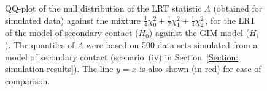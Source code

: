 \documentclass[11pt]{article}
\begin{document}
\vspace*{0.5cm}

\begin{figure}[t]
\vspace*{-0.5cm}
\caption{QQ-plot of the null distribution of the LRT statistic $\Lambda$ (obtained for simulated data) against the mixture $\frac{1}{4} \chi^2_0 +\frac{1}{2} \chi^2_1 +\frac{1}{4} \chi^2_2$\,, for the LRT of the model of secondary contact ($H_0$) against the GIM model ($H_1$). The quantiles of $\Lambda$ were based on 500 data sets simulated from a model of secondary contact (scenario~(iv) in Section~\ref{Section: simulation results}).
The line $y=x$ is also shown (in red) for ease of comparison.
 }
\label{additional QQplot}
\end{figure}


\clearpage


\end{document}
